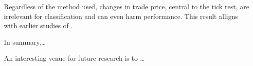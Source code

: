 Regardless of the method used, changes in trade price, central to the tick test, are irrelevant for classification and can even harm performance. This result alligns with earlier studies of \textcites{savickasInferringDirectionOption2003}{grauerOptionTradeClassification2022}.

In summary,\dots

An interesting venue for future research is to \dots






